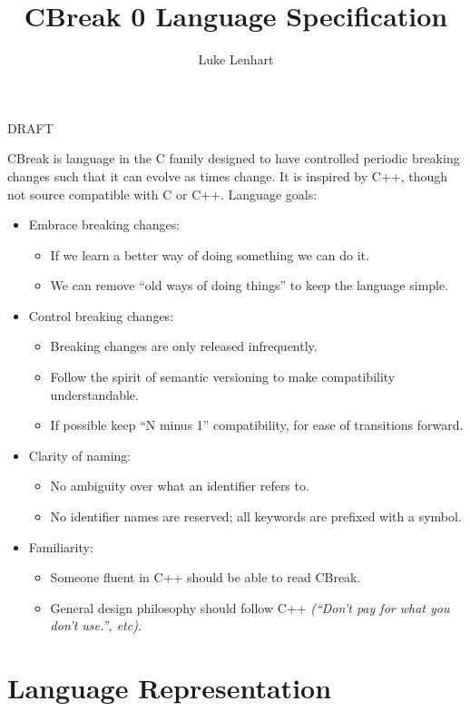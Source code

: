 \documentclass{article}
\title{CBreak 0 Language Specification}
\date{}
\author{Luke Lenhart}
\begin{document}
\maketitle
DRAFT

CBreak is language in the C family designed to have controlled periodic breaking changes such that it can evolve as times change.  It is inspired by C++, though not source compatible with C or C++.
\medbreak
Language goals:
\begin{itemize}
 \item Embrace breaking changes:
  \begin{itemize}
    \item If we learn a better way of doing something we can do it.
    \item We can remove ``old ways of doing things'' to keep the language simple.
  \end{itemize}
  \item Control breaking changes:
  \begin{itemize}
    \item Breaking changes are only released infrequently.
    \item Follow the spirit of semantic versioning to make compatibility understandable.
    \item If possible keep ``N minus 1'' compatibility, for ease of transitions forward.
  \end{itemize}
  \item Clarity of naming:
  \begin{itemize}
    \item No ambiguity over what an identifier refers to.
    \item No identifier names are reserved; all keywords are prefixed with a symbol.
  \end{itemize}
  \item Familiarity:
  \begin{itemize}
    \item Someone fluent in C++ should be able to read CBreak.
    \item General design philosophy should follow C++ \textit{(``Don't pay for what you don't use.'', etc)}.
  \end{itemize}
\end{itemize}
\newpage


\tableofcontents
\newpage


\section{Language Representation}
\end{document}
